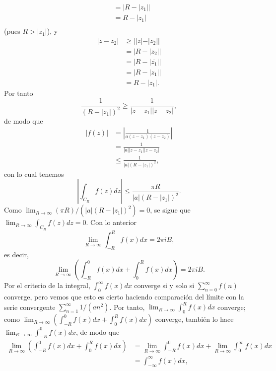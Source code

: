 {\begin{itemize}
$$\begin{aligned}
                   &=|R-|z_1||\\
                   &=R-|z_1|\\
         \end{aligned}
         $$
         (pues $R>|z_1|$), y
         $$
         \begin{aligned}
            |z-z_2|&\geq||z|-|z_2||\\
                   &=|R-|z_2||\\
                   &=|R-|\overline{z_1}||\\
                   &=|R-|z_1||\\
                   &=R-|z_1|.
         \end{aligned}
         $$
         Por tanto
         $$
         \frac{1}{(R-|z_1|)^2}\geq\frac{1}{|z-z_1||z-z_2|},
         $$
         de modo que
         $$
         \begin{aligned}
            |f(z)|&=\left|\frac{1}{a(z-z_1)(z-z_2)}\right|\\
                  &=\frac{1}{|a||z-z_1||z-z_2|}\\
                  &\leq\frac{1}{|a|(R-|z_1|)^2},
         \end{aligned}
         $$
         con lo cual tenemos
         $$
         \left|\int_{C_R}f(z)dz\right|\leq \frac{\pi R}{|a|(R-|z_1|)^2}.
         $$
         Como $\lim_{R\to\infty}(\pi R)/(|a|(R-|z_1|)^2)=0$, se sigue que $\lim_{R\to\infty} \int_{C_R}f(z)dz=0$. Con lo anterior
         $$
         \lim_{R\to\infty}\int_{-R}^{R}f(x)dx=2\pi i B,
         $$
         es decir, 
         $$
         \lim_{R\to\infty}\left( \int_{-R}^{0}f(x)dx+\int_{0}^{R}f(x)dx\right)=2 \pi i B.
         $$
         Por el criterio de la integral, $\int_{0}^{\infty}f(x)dx$ converge si y solo si $\sum_{n=0}^{\infty}f(n)$ converge, pero vemos que esto es cierto haciendo comparación del límite con la serie convergente $\sum_{n=1}^{\infty}1/(an^2)$. Por tanto, $\lim_{R\to\infty}\int_{0}^{R}f(x)dx$ converge; como $\lim_{R\to\infty}\left( \int_{-R}^{0}f(x)dx+\int_{0}^{R}f(x)dx\right)$ converge, también lo hace $\lim_{R\to\infty}\int_{-R}^{0}f(x)dx$, de modo que
         $$
         \begin{aligned}
            \lim_{R\to\infty}\left( \int_{-R}^{0}f(x)dx+\int_{0}^{R}f(x)dx\right)&=\lim_{R\to\infty}\int_{-R}^{0}f(x)dx+\lim_{R\to\infty}\int_{0}^{\infty}f(x)dx\\
                                                                                               &=\int_{-\infty}^{\infty} f(x)dx,

\end{aligned}$$
\end{itemize}}
